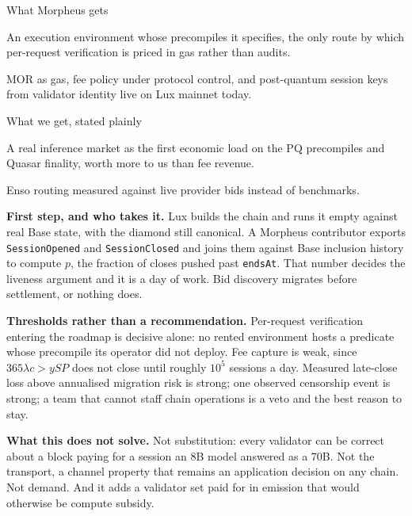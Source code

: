 \documentclass[10pt,a4paper]{article}
\newcommand{\code}[1]{\texttt{\small #1}}
\begin{document}
\begin{stake}{What Morpheus gets}
\item An execution environment whose precompiles it specifies, the only route by which per-request
verification is priced in gas rather than audits.
\item MOR as gas, fee policy under protocol control, and post-quantum session keys from validator
identity live on Lux mainnet today.
\end{stake}

\begin{stake}{What we get, stated plainly}
\item A real inference market as the first economic load on the PQ precompiles and Quasar finality,
worth more to us than fee revenue.
\item Enso routing measured against live provider bids instead of benchmarks.
\end{stake}

\noindent\textbf{First step, and who takes it.}
Lux builds the chain and runs it empty against real Base state, with the diamond still canonical.
A Morpheus contributor exports \code{SessionOpened} and \code{SessionClosed} and joins them against
Base inclusion history to compute $p$, the fraction of closes pushed past \code{endsAt}. That number
decides the liveness argument and it is a day of work. Bid discovery migrates before settlement, or
nothing does.

\vspace{0.35ex}
\noindent\textbf{Thresholds rather than a recommendation.}
Per-request verification entering the roadmap is decisive alone: no rented environment hosts a
predicate whose precompile its operator did not deploy. Fee capture is weak, since
$365\lambda c > ySP$ does not close until roughly $10^5$ sessions a day. Measured late-close loss
above annualised migration risk is strong; one observed censorship event is strong; a team that
cannot staff chain operations is a veto and the best reason to stay.

\vspace{0.35ex}
\noindent\textbf{What this does not solve.}
Not substitution: every validator can be correct about a block paying for a session an 8B model
answered as a 70B. Not the transport, a channel property that remains an application decision on any
chain. Not demand. And it adds a validator set paid for in emission that would otherwise be compute
subsidy.

\vspace{0.4ex}
\end{document}

